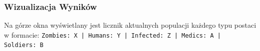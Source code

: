 \documentclass[12pt,a4paper]{article}
\begin{document}
\subsubsection{Wizualizacja Wyników}
Na górze okna wyświetlany jest licznik aktualnych populacji każdego typu
postaci w formacie: \texttt{Zombies: X | Humans: Y | Infected: Z | Medics: A |
	Soldiers: B}




\end{document}
